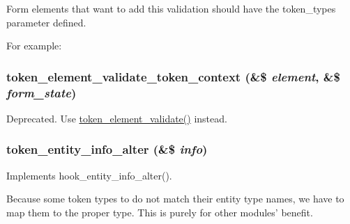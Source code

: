 Form elements that want to add this validation should have the token\_\-types parameter defined.

For example: 
 \hypertarget{token_8module_abbe1ab0d6a3c879dd953427f7d0a4f8e}{
\subsubsection[{token\_\-element\_\-validate\_\-token\_\-context}]{\setlength{\rightskip}{0pt plus 5cm}token\_\-element\_\-validate\_\-token\_\-context (\&\$ {\em element}, \/  \&\$ {\em form\_\-state})}}
\label{token_8module_abbe1ab0d6a3c879dd953427f7d0a4f8e}
Deprecated. Use \hyperlink{token_8module_acaac5d083e5f83323e9e2914223a729e}{token\_\-element\_\-validate()} instead. \hypertarget{token_8module_a9015db039cba923ed4bb1167faa8a4a8}{
\subsubsection[{token\_\-entity\_\-info\_\-alter}]{\setlength{\rightskip}{0pt plus 5cm}token\_\-entity\_\-info\_\-alter (\&\$ {\em info})}}
\label{token_8module_a9015db039cba923ed4bb1167faa8a4a8}
Implements hook\_\-entity\_\-info\_\-alter().

Because some token types to do not match their entity type names, we have to map them to the proper type. This is purely for other modules' benefit.

